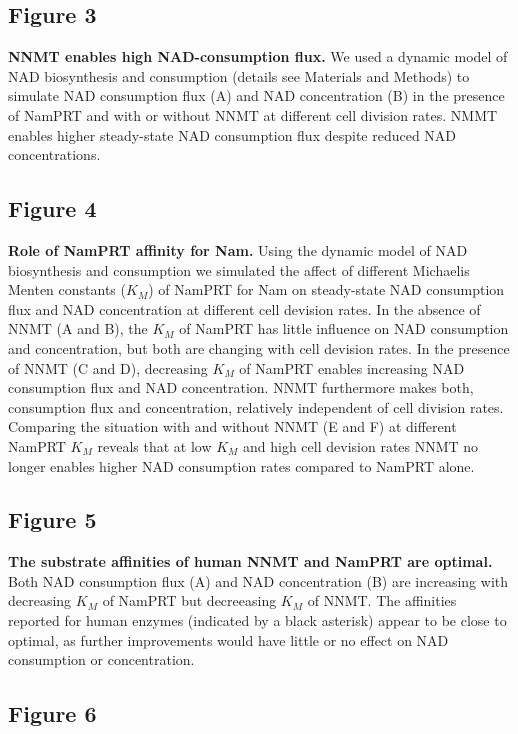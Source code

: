 \subsection{Figure 3}

\textbf{NNMT enables high NAD-consumption flux.} We used a dynamic model of NAD biosynthesis and consumption (details see Materials and Methods) to simulate NAD consumption flux (A) and NAD concentration (B) in the presence of NamPRT and with or without NNMT at different cell division rates. NMMT enables higher steady-state NAD consumption flux despite reduced NAD concentrations.


\subsection{Figure 4}

\textbf{Role of NamPRT affinity for Nam.} Using the dynamic model of NAD biosynthesis and consumption we simulated the affect of different Michaelis Menten constants ($K_M$) of NamPRT for Nam on steady-state NAD consumption flux and NAD concentration at different cell devision rates. In the absence of NNMT (A and B), the $K_M$ of NamPRT has little influence on NAD consumption and concentration, but both are changing with cell devision rates. In the presence of NNMT (C and D), decreasing $K_M$ of NamPRT enables increasing NAD consumption flux and NAD concentration. NNMT furthermore makes both, consumption flux and concentration, relatively independent of cell division rates. Comparing the situation with and without NNMT (E and F) at different NamPRT $K_M$ reveals that at low $K_M$ and high cell devision rates NNMT no longer enables higher NAD consumption rates compared to NamPRT alone.


\subsection{Figure 5}

\textbf{The substrate affinities of human NNMT and NamPRT are optimal.} Both NAD consumption flux (A) and NAD concentration (B) are increasing with decreasing $K_M$ of NamPRT but decreeasing $K_M$ of NNMT. The affinities reported for human enzymes (indicated by a black asterisk) appear to be close to optimal, as further improvements would have little or no effect on NAD consumption or concentration.


\subsection{Figure 6}

